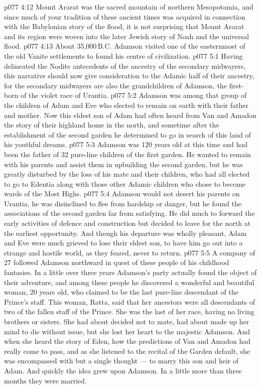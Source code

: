 \vs p077 4:12 Mount Ararat was the sacred mountain of northern Mesopotamia, and since much of your tradition of these ancient times was acquired in connection with the Babylonian story of the flood, it is not surprising that Mount Ararat and its region were woven into the later Jewish story of Noah and the universal flood.
\vs p077 4:13 About 35,000\,B.C. Adamson visited one of the easternmost of the old Vanite settlements to found his centre of civilization.
\vs p077 5:1 Having delineated the Nodite antecedents of the ancestry of the secondary midwayers, this narrative should now give consideration to the Adamic half of their ancestry, for the secondary midwayers are also the grandchildren of Adamson, the first\hyp{}born of the violet race of Urantia.
\vs p077 5:2 \pc Adamson was among that group of the children of Adam and Eve who elected to remain on earth with their father and mother. Now this eldest son of Adam had often heard from Van and Amadon the story of their highland home in the north, and sometime after the establishment of the second garden he determined to go in search of this land of his youthful dreams.
\vs p077 5:3 Adamson was 120 years old at this time and had been the father of 32 pure\hyp{}line children of the first garden. He wanted to remain with his parents and assist them in upbuilding the second garden, but he was greatly disturbed by the loss of his mate and their children, who had all elected to go to Edentia along with those other Adamic children who chose to become wards of the Most Highs.
\vs p077 5:4 Adamson would not desert his parents on Urantia, he was disinclined to flee from hardship or danger, but he found the associations of the second garden far from satisfying. He did much to forward the early activities of defence and construction but decided to leave for the north at the earliest opportunity. And though his departure was wholly pleasant, Adam and Eve were much grieved to lose their eldest son, to have him go out into a strange and hostile world, as they feared, never to return.
\vs p077 5:5 A company of 27 followed Adamson northward in quest of these people of his childhood fantasies. In a little over three years Adamson’s party actually found the object of their adventure, and among these people he discovered a wonderful and beautiful woman, 20 years old, who claimed to be the last pure\hyp{}line descendant of the Prince’s staff. This woman, Ratta, said that her ancestors were all descendants of two of the fallen staff of the Prince. She was the last of her race, having no living brothers or sisters. She had about decided not to mate, had about made up her mind to die without issue, but she lost her heart to the majestic Adamson. And when she heard the story of Eden, how the predictions of Van and Amadon had really come to pass, and as she listened to the recital of the Garden default, she was encompassed with but a single thought --- to marry this son and heir of Adam. And quickly the idea grew upon Adamson. In a little more than three months they were married.
